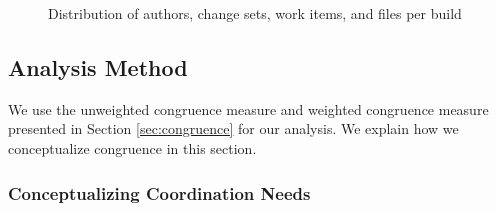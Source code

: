 \documentclass[12pt,oneside]{book}
\begin{document}
\begin{figure}[ht]
{		\label{fig:hist_workitems}
	}	
	\caption{Distribution of authors, change sets, work items, and files per build}
	\label{fig:entities_per_build}

\end{figure}

%

\subsection{Analysis Method}
\label{sec:analysis}

We use the unweighted congruence measure and weighted congruence measure presented in Section \ref{sec:congruence} for our analysis. We explain how we conceptualize congruence in this section.

\subsubsection{Conceptualizing Coordination Needs}
\end{document}
